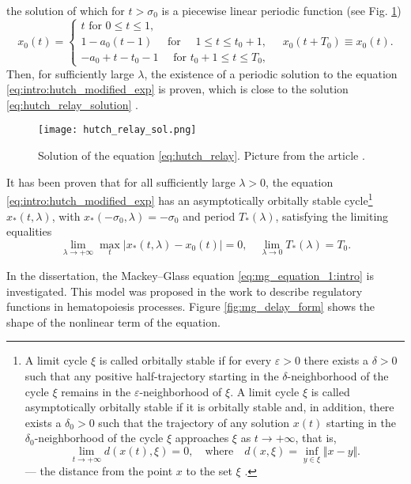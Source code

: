 the solution of which for $t > \sigma_0$ is a piecewise linear periodic function (see Fig. \ref{fig:hutch_relax})
\begin{equation}
	\label{eq:hutch_relay_solution}
	x_0(t) = \left\{
	\begin{array}{l}
		t \text{ for } 0 \leq t \leq 1, \\
		1 - a_0(t - 1) \quad \text{ for } \quad 1 \leq t \leq t_0 + 1, \\
		-a_0 + t - t_0 - 1 \quad \text{ for } t_0 + 1 \leq t \leq T_0,
	\end{array} \quad x_0\left(t + T_0\right) \equiv x_0(t) .\right.
\end{equation}
Then, for sufficiently large $\lambda$, the existence of a periodic solution to the equation \eqref{eq:intro:hutch_modified_exp} is proven, which is close to the solution \eqref{eq:hutch_relay_solution} \cite{Kolesov2010}.

\begin{figure}
	\centering
	\texttt{[image: hutch\_relay\_sol.png]}
	\caption{Solution of the equation \eqref{eq:hutch_relay}. Picture from the article \cite{Kolesov2010}.}
	\label{fig:hutch_relax}
\end{figure}

It has been proven that for all sufficiently large $\lambda > 0$, the equation \eqref{eq:intro:hutch_modified_exp} has an asymptotically orbitally stable cycle\footnote{A limit cycle $\xi$ is called orbitally stable if for every $\varepsilon > 0$ there exists a $\delta > 0$ such that any positive half-trajectory starting in the $\delta$-neighborhood of the cycle $\xi$ remains in the $\varepsilon$-neighborhood of $\xi$. A limit cycle $\xi$ is called asymptotically orbitally stable if it is orbitally stable and, in addition, there exists a $\delta_0 > 0$ such that the trajectory of any solution $x(t)$ starting in the $\delta_0$-neighborhood of the cycle $\xi$ approaches $\xi$ as $t \to +\infty$, that is,
	\[
	\lim\limits_{t\to +\infty} d(x(t), \xi) = 0, \quad \text{where} \quad d(x, \xi) = \inf_{y\in \xi} \Vert x - y \Vert.
	\]
	--- the distance from the point $x$ to the set $\xi$ \cite{MathEncyclopedy1984}.} $x_*(t, \lambda)$, with $x_*(-\sigma_0, \lambda) = -\sigma_0$ and period $T_*(\lambda)$, satisfying the limiting equalities
\[
\lim _{\lambda \rightarrow +\infty} \max_t \left|x_*(t, \lambda) - x_0(t)\right|=0, \quad \lim _{\lambda \rightarrow 0} T_*(\lambda) = T_0.
\]

In the dissertation, the Mackey--Glass equation \eqref{eq:mg_equation_1:intro} is investigated. This model was proposed in the work \cite{Mackey1977} to describe regulatory functions in hematopoiesis processes. Figure \ref{fig:mg_delay_form} shows the shape of the nonlinear term of the equation.

